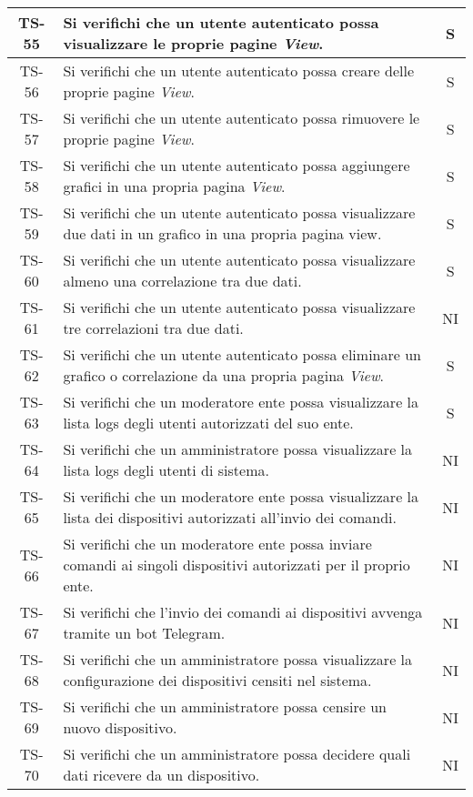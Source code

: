 \begin{center}
\begin{longtable}{|c|p{10cm}|c|}
			 TS-55 & Si verifichi che un utente autenticato possa visualizzare le proprie pagine \textit{View}. & S \\
			 \hline
			 TS-56 & Si verifichi che un utente autenticato possa creare delle proprie pagine \textit{View}. & S \\
			 \hline
			 TS-57 & Si verifichi che un utente autenticato possa rimuovere le proprie pagine \textit{View}. & S \\
			 \hline
			 TS-58 & Si verifichi che un utente autenticato possa aggiungere grafici in una propria pagina  \textit{View}. & S \\
			 \hline
			 TS-59 & Si verifichi che un utente autenticato possa visualizzare due dati in un grafico in una propria pagina view. & S \\
			 \hline
			 TS-60 & Si verifichi che un utente autenticato possa visualizzare almeno una correlazione tra due dati. & S \\
			 \hline
			 TS-61 & Si verifichi che un utente autenticato possa visualizzare tre correlazioni tra due dati. & NI \\
			 \hline
			 TS-62 & Si verifichi che un utente autenticato possa eliminare un grafico o correlazione da una propria pagina \textit{View}. & S \\
			 \hline
			 TS-63 & Si verifichi che un moderatore ente possa visualizzare la lista logs degli utenti autorizzati del suo ente. & S \\
			 \hline
			 TS-64 & Si verifichi che un amministratore possa visualizzare la lista logs degli utenti di sistema. & NI \\
			 \hline
			 TS-65 & Si verifichi che un moderatore ente possa visualizzare la lista dei dispositivi autorizzati all'invio dei comandi. & NI \\
			 \hline
			 TS-66 & Si verifichi che un moderatore ente possa inviare comandi ai singoli dispositivi autorizzati per il proprio ente. & NI \\
			 \hline
			 TS-67 & Si verifichi che l'invio dei comandi ai dispositivi avvenga tramite un bot Telegram. & NI \\
			 \hline
			 TS-68 & Si verifichi che un amministratore possa visualizzare la configurazione dei dispositivi censiti nel sistema. & NI \\
			 \hline
			 TS-69 & Si verifichi che un amministratore possa censire un nuovo dispositivo. & NI \\
			 \hline
			 TS-70 & Si verifichi che un amministratore possa decidere quali dati ricevere da un dispositivo. & NI \\

\end{longtable}
\end{center}
